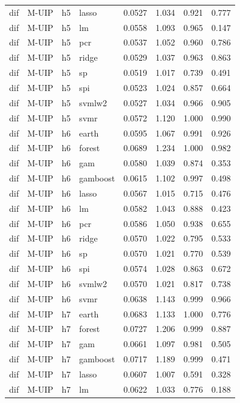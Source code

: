 \begin{ThreePartTable}
\begin{longtable}[t]{llclcccc}
dif & M-UIP & h5 & lasso & 0.0527 & 1.034 & 0.921 & 0.777\\
dif & M-UIP & h5 & lm & 0.0558 & 1.093 & 0.965 & 0.147\\
dif & M-UIP & h5 & pcr & 0.0537 & 1.052 & 0.960 & 0.786\\
dif & M-UIP & h5 & ridge & 0.0529 & 1.037 & 0.963 & 0.863\\
dif & M-UIP & h5 & sp & 0.0519 & 1.017 & 0.739 & 0.491\\
dif & M-UIP & h5 & spi & 0.0523 & 1.024 & 0.857 & 0.664\\
dif & M-UIP & h5 & svmlw2 & 0.0527 & 1.034 & 0.966 & 0.905\\
dif & M-UIP & h5 & svmr & 0.0572 & 1.120 & 1.000 & 0.990\\
\addlinespace
dif & M-UIP & h6 & earth & 0.0595 & 1.067 & 0.991 & 0.926\\
dif & M-UIP & h6 & forest & 0.0689 & 1.234 & 1.000 & 0.982\\
dif & M-UIP & h6 & gam & 0.0580 & 1.039 & 0.874 & 0.353\\
dif & M-UIP & h6 & gamboost & 0.0615 & 1.102 & 0.997 & 0.498\\
dif & M-UIP & h6 & lasso & 0.0567 & 1.015 & 0.715 & 0.476\\
dif & M-UIP & h6 & lm & 0.0582 & 1.043 & 0.888 & 0.423\\
dif & M-UIP & h6 & pcr & 0.0586 & 1.050 & 0.938 & 0.655\\
dif & M-UIP & h6 & ridge & 0.0570 & 1.022 & 0.795 & 0.533\\
dif & M-UIP & h6 & sp & 0.0570 & 1.021 & 0.770 & 0.539\\
dif & M-UIP & h6 & spi & 0.0574 & 1.028 & 0.863 & 0.672\\
dif & M-UIP & h6 & svmlw2 & 0.0570 & 1.021 & 0.817 & 0.738\\
dif & M-UIP & h6 & svmr & 0.0638 & 1.143 & 0.999 & 0.966\\
\addlinespace
dif & M-UIP & h7 & earth & 0.0683 & 1.133 & 1.000 & 0.776\\
dif & M-UIP & h7 & forest & 0.0727 & 1.206 & 0.999 & 0.887\\
dif & M-UIP & h7 & gam & 0.0661 & 1.097 & 0.981 & 0.505\\
dif & M-UIP & h7 & gamboost & 0.0717 & 1.189 & 0.999 & 0.471\\
dif & M-UIP & h7 & lasso & 0.0607 & 1.007 & 0.591 & 0.328\\
dif & M-UIP & h7 & lm & 0.0622 & 1.033 & 0.776 & 0.188\\

\end{longtable}
\end{ThreePartTable}
